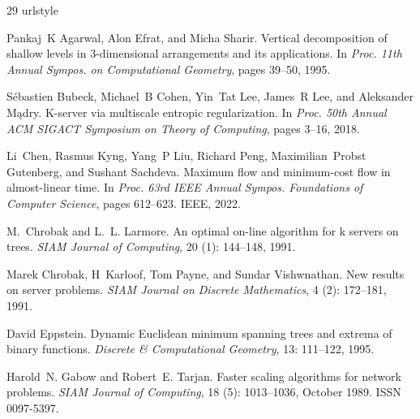 \documentclass[11pt,onecolumn]{article}
\begin{document}
\begin{thebibliography}{29}
\providecommand{\natexlab}[1]{#1}
\providecommand{\url}[1]{\texttt{#1}}
\expandafter\ifx\csname urlstyle\endcsname\relax
  \providecommand{\doi}[1]{doi: #1}\else
  \providecommand{\doi}{doi: \begingroup \urlstyle{rm}\Url}\fi

Pankaj~K Agarwal, Alon Efrat, and Micha Sharir.
\newblock Vertical decomposition of shallow levels in 3-dimensional arrangements and its applications.
\newblock In \emph{Proc. 11th Annual Sympos. on Computational Geometry}, pages 39--50, 1995.

S{\'e}bastien Bubeck, Michael~B Cohen, Yin~Tat Lee, James~R Lee, and Aleksander M{\k{a}}dry.
\newblock K-server via multiscale entropic regularization.
\newblock In \emph{Proc. 50th Annual ACM SIGACT Symposium on Theory of Computing}, pages 3--16, 2018.

Li~Chen, Rasmus Kyng, Yang~P Liu, Richard Peng, Maximilian~Probst Gutenberg, and Sushant Sachdeva.
\newblock Maximum flow and minimum-cost flow in almost-linear time.
\newblock In \emph{Proc. 63rd IEEE Annual Sympos. Foundations of Computer Science}, pages 612--623. IEEE, 2022.

M.~Chrobak and L.~L. Larmore.
\newblock An optimal on-line algorithm for k servers on trees.
\newblock \emph{SIAM Journal of Computing}, 20 (1): 144--148, 1991.

Marek Chrobak, H~Karloof, Tom Payne, and Sundar Vishwnathan.
\newblock New results on server problems.
\newblock \emph{SIAM Journal on Discrete Mathematics}, 4 (2): 172--181, 1991.

David Eppstein.
\newblock Dynamic {E}uclidean minimum spanning trees and extrema of binary functions.
\newblock \emph{Discrete \& Computational Geometry}, 13: 111--122, 1995.

Harold~N. Gabow and Robert~E. Tarjan.
\newblock Faster scaling algorithms for network problems.
\newblock \emph{SIAM Journal of Computing}, 18 (5): 1013--1036, October 1989.
\newblock ISSN 0097-5397.


\end{thebibliography}
\end{document}

